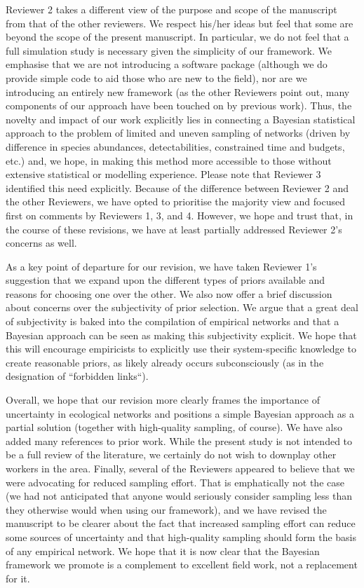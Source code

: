 \documentclass[12pt]{letter}
\begin{document}
	Reviewer 2 takes a different view of the purpose and scope of the manuscript from that of the other reviewers. We respect his/her ideas but feel that some are beyond the scope of the present manuscript. In particular, we do not feel that a full simulation study is necessary given the simplicity of our framework. We emphasise that we are not introducing a software package (although we do provide simple code to aid those who are new to the field), nor are we introducing an entirely new framework (as the other Reviewers point out, many components of our approach have been touched on by previous work). Thus, the novelty and impact of our work explicitly lies in connecting a Bayesian statistical approach to the problem of limited and uneven sampling of networks (driven by difference in species abundances, detectabilities, constrained time and budgets, etc.) and, we hope, in making this method more accessible to those without extensive statistical or modelling experience. Please note that Reviewer 3 identified this need explicitly. 
	Because of the difference between Reviewer 2 and the other Reviewers, we have opted to prioritise the majority view and focused first on comments by Reviewers 1, 3, and 4. However, we hope and trust that, in the course of these revisions, we have at least partially addressed Reviewer 2's concerns as well. 


	As a key point of departure for our revision, we have taken Reviewer 1's suggestion that we expand upon the different types of priors available and reasons for choosing one over the other. We also now offer a brief discussion about concerns over the subjectivity of prior selection. We argue that a great deal of subjectivity is baked into the compilation of empirical networks and that a Bayesian approach can be seen as making this subjectivity explicit. We hope that this will encourage empiricists to explicitly use their system-specific knowledge to create reasonable priors, as likely already occurs subconsciously (as in the designation of ``forbidden links``). 


	Overall, we hope that our revision more clearly frames the importance of uncertainty in ecological networks and positions a simple Bayesian approach as a partial solution (together with high-quality sampling, of course). 
	We have also added many references to prior work. While the present study is not intended to be a full review of the literature, we certainly do not wish to downplay other workers in the area.
	Finally, several of the Reviewers appeared to believe that we were advocating for reduced sampling effort. That is emphatically not the case (we had not anticipated that anyone would seriously consider sampling less than they otherwise would when using our framework), and we have revised the manuscript to be clearer about the fact that increased sampling effort can reduce some sources of uncertainty and that high-quality sampling should form the basis of any empirical network. We hope that it is now clear that the Bayesian framework we promote is a complement to excellent field work, not a replacement for it.
\end{document}
